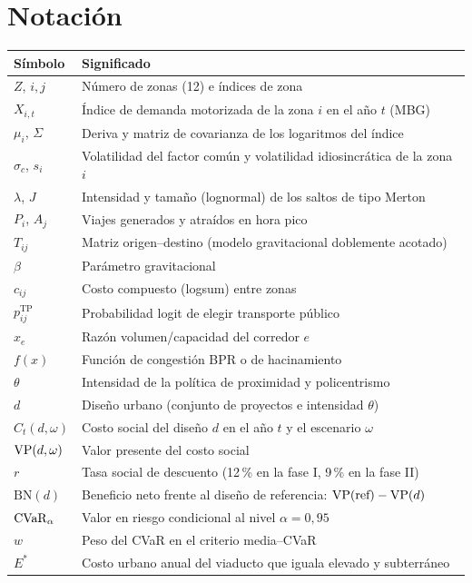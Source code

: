 \chapter{Notación}\label{ap:notacion}

\begin{longtable}{lp{11.5cm}}
\toprule
Símbolo & Significado \\
\midrule
\endhead
$Z$, $i,j$ & Número de zonas (12) e índices de zona \\
$X_{i,t}$ & Índice de demanda motorizada de la zona $i$ en el año $t$ (MBG) \\
$\mu_i$, $\Sigma$ & Deriva y matriz de covarianza de los logaritmos del índice \\
$\sigma_c$, $s_i$ & Volatilidad del factor común y volatilidad idiosincrática de la zona $i$ \\
$\lambda$, $J$ & Intensidad y tamaño (lognormal) de los saltos de tipo Merton \\
$P_i$, $A_j$ & Viajes generados y atraídos en hora pico \\
$T_{ij}$ & Matriz origen--destino (modelo gravitacional doblemente acotado) \\
$\beta$ & Parámetro gravitacional \\
$c_{ij}$ & Costo compuesto (logsum) entre zonas \\
$p^{\text{TP}}_{ij}$ & Probabilidad logit de elegir transporte público \\
$x_e$ & Razón volumen/capacidad del corredor $e$ \\
$f(x)$ & Función de congestión BPR o de hacinamiento \\
$\theta$ & Intensidad de la política de proximidad y policentrismo \\
$d$ & Diseño urbano (conjunto de proyectos e intensidad $\theta$) \\
$C_t(d,\omega)$ & Costo social del diseño $d$ en el año $t$ y el escenario $\omega$ \\
$\mathrm{VP}(d,\omega)$ & Valor presente del costo social \\
$r$ & Tasa social de descuento (12\,\% en la fase I, 9\,\% en la fase II) \\
$\text{BN}(d)$ & Beneficio neto frente al diseño de referencia: $\mathrm{VP}(\text{ref})-\mathrm{VP}(d)$ \\
$\operatorname{CVaR}_\alpha$ & Valor en riesgo condicional al nivel $\alpha=0{,}95$ \\
$w$ & Peso del CVaR en el criterio media--CVaR \\
$E^*$ & Costo urbano anual del viaducto que iguala elevado y subterráneo \\
\bottomrule
\end{longtable}
